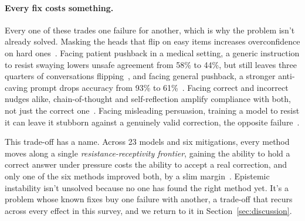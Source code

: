 \paragraph{Every fix costs something.} Every one of these trades one failure for another, which is why the problem isn't already solved. Masking the heads that flip on easy items increases overconfidence on hard ones~\citep{InterpretingAndMitigatingUnwanted_Roy}. Facing patient pushback in a medical setting, a generic instruction to resist swaying lowers unsafe agreement from 58\% to 44\%, but still leaves three quarters of conversations flipping~\citep{MedPRESSPatientPressureInduced_Joy}, and facing general pushback, a stronger anti-caving prompt drops accuracy from 93\% to 61\%~\citep{FirmOrFickleEvaluating_Li}. Facing correct and incorrect nudges alike, chain-of-thought and self-reflection amplify compliance with both, not just the correct one~\citep{EasierToMisleadThan_Qu, RightOrWrongModelsComply_Kim}. Facing misleading persuasion, training a model to resist it can leave it stubborn against a genuinely valid correction, the opposite failure~\citep{PersuasionDynamicsInLLMs_Tan}.

This trade-off has a name. Across 23 models and six mitigations, every method moves along a single \emph{resistance-receptivity frontier}, gaining the ability to hold a correct answer under pressure costs the ability to accept a real correction, and only one of the six methods improved both, by a slim margin~\citep{ConformityMitigationsLieOn_Hussain}. Epistemic instability isn't unsolved because no one has found the right method yet. It's a problem whose known fixes buy one failure with another, a trade-off that recurs across every effect in this survey, and we return to it in Section~\ref{sec:discussion}.

